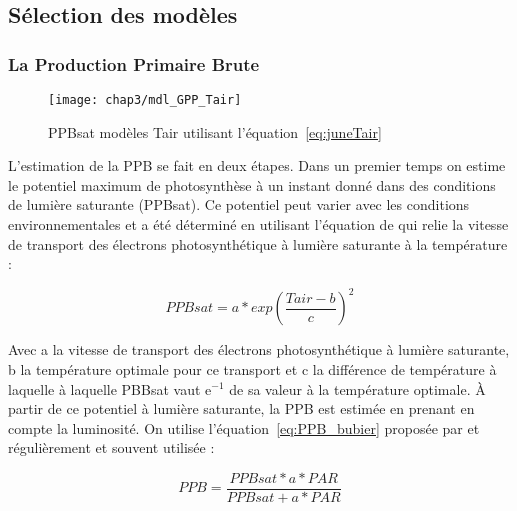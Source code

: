 \subsection{Sélection des modèles}

\subsubsection{La Production Primaire Brute}

\begin{figure}
\centering
\texttt{[image: chap3/mdl\_GPP\_Tair]}
\caption{PPBsat modèles Tair utilisant l'équation~\ref{eq:juneTair}}
\label{fig:mdl_GPP_Tair}
\end{figure}

L'estimation de la PPB se fait en deux étapes.
Dans un premier temps on estime le potentiel maximum de photosynthèse à un instant donné dans des conditions de lumière saturante (PPBsat).
Ce potentiel peut varier avec les conditions environnementales et a été déterminé en utilisant l'équation de \cite{june2004} qui relie la vitesse de transport des électrons photosynthétique à lumière saturante à la température :

\begin{equation}\label{eq:juneTair}
PPBsat = a * exp(\frac{Tair - b}{c})^2
\end{equation}

Avec a la vitesse de transport des électrons photosynthétique à lumière saturante, b la température optimale pour ce transport et c la différence de température à laquelle à laquelle PBBsat vaut e$^{-1}$ de sa valeur à la température optimale.
À partir de ce potentiel à lumière saturante, la PPB est estimée en prenant en compte la luminosité.
On utilise l'équation~\ref{eq:PPB_bubier} proposée par \cite{bubier1998} et régulièrement et souvent utilisée \cite{bortoluzzi2006,worrall2009}:

\begin{equation} \label{eq:PPB_bubier}
PPB = \frac{PPBsat * a * PAR}{PPBsat + a * PAR}
\end{equation}

